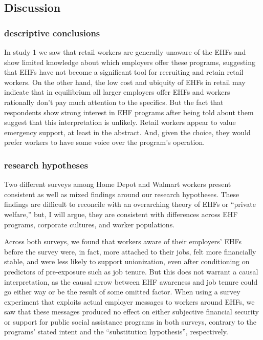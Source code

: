\documentclass[
  11pt,
  oneside]{article}
\begin{document}
\subsection{Discussion}\label{discussion}

\subsubsection{descriptive conclusions}\label{descriptive-conclusions}

In study 1 we saw that retail workers are generally unaware of the EHFs and show limited knowledge about which employers offer these programs, suggesting that EHFs have not become a significant tool for recruiting and retain retail workers. On the other hand, the low cost and ubiquity of EHFs in retail may indicate that in equilibrium all larger employers offer EHFs and workers rationally don't pay much attention to the specifics. But the fact that respondents show strong interest in EHF programs after being told about them suggest that this interpretation is unlikely. Retail workers appear to value emergency support, at least in the abstract. And, given the choice, they would prefer workers to have some voice over the program's operation.

\subsubsection{research hypotheses}\label{research-hypotheses}

Two different surveys among Home Depot and Walmart workers present consistent as well as mixed findings around our research hypotheses. These findings are difficult to reconcile with an overarching theory of EHFs or ``private welfare,'' but, I will argue, they are consistent with differences across EHF programs, corporate cultures, and worker populations.

Across both surveys, we found that workers aware of their employers' EHFs before the survey were, in fact, more attached to their jobs, felt more financially stable, and were less likely to support unionization, even after conditioning on predictors of pre-exposure such as job tenure. But this does not warrant a causal interpretation, as the causal arrow between EHF awareness and job tenure could go either way or be the result of some omitted factor. When using a survey experiment that exploits actual employer messages to workers around EHFs, we saw that these messages produced no effect on either subjective financial security or support for public social assistance programs in both surveys, contrary to the programs' stated intent and the ``substitution hypothesis'', respectively.
\end{document}
